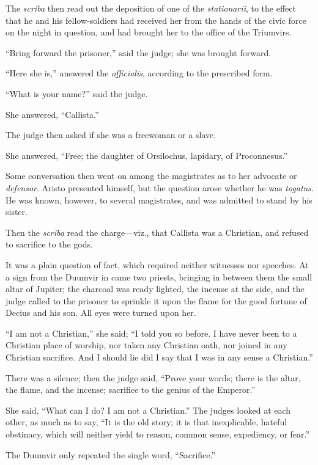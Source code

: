 The \emph{scriba} then read out the deposition of one of the \emph{stationarii},
to the effect that he and his fellow-soldiers had received her from
the hands of the civic force on the night in question, and had brought
her to the office of the Triumvirs.

``Bring forward the prisoner,'' said the judge; she was
brought forward.

``Here she is,'' answered the \emph{officialis}, according
to the prescribed form.

``What is your name?'' said the judge.

She answered, ``Callista.''

The judge then asked if she was a freewoman or a slave.

She answered, ``Free; the daughter of Orsilochus, lapidary, of
Proconnesus.''

Some conversation then went on among the magistrates as to her
advocate or \emph{defensor}. Aristo presented himself, but the
question arose whether he was \emph{togatus}. He was known, however,
to several magistrates, and was admitted to stand by his sister.

Then the \emph{scriba} read the charge—viz., that Callista was a
Christian, and refused to sacrifice to the gods.

It was a plain question of fact, which required neither witnesses
nor speeches. At a sign from the Duumvir in came two priests, bringing
in between them the small altar of Jupiter; the charcoal was ready
lighted, the incense at the side, and the judge called to the prisoner
to sprinkle it upon the flame for the good fortune of Decius and his
son. All eyes were turned upon her.

``I am not a Christian,'' she said; ``I told you so
before. I have never been to a Christian place of worship, nor taken
any Christian oath, nor joined in any Christian sacrifice. And I
should lie did I say that I was in any sense a Christian.''

There was a silence; then the judge said, ``Prove your words;
there is the altar, the flame, and the incense; sacrifice to the
genius of the Emperor.''

She said, ``What can I do? I am not a Christian.'' The
judges looked at each other, as much as to say, ``It is the old
story; it is that inexplicable, hateful obstinacy, which will neither
yield to reason, common sense, expediency, or fear.''

The Duumvir only repeated the single word, ``Sacrifice.''

